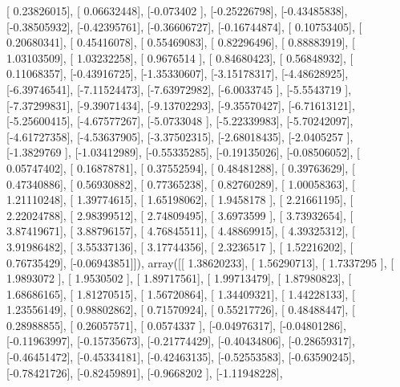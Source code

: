 \documentclass{article}
\begin{document}
       [ 0.23826015],
       [ 0.06632448],
       [-0.073402  ],
       [-0.25226798],
       [-0.43485838],
       [-0.38505932],
       [-0.42395761],
       [-0.36606727],
       [-0.16744874],
       [ 0.10753405],
       [ 0.20680341],
       [ 0.45416078],
       [ 0.55469083],
       [ 0.82296496],
       [ 0.88883919],
       [ 1.03103509],
       [ 1.03232258],
       [ 0.9676514 ],
       [ 0.84680423],
       [ 0.56848932],
       [ 0.11068357],
       [-0.43916725],
       [-1.35330607],
       [-3.15178317],
       [-4.48628925],
       [-6.39746541],
       [-7.11524473],
       [-7.63972982],
       [-6.0033745 ],
       [-5.5543719 ],
       [-7.37299831],
       [-9.39071434],
       [-9.13702293],
       [-9.35570427],
       [-6.71613121],
       [-5.25600415],
       [-4.67577267],
       [-5.0733048 ],
       [-5.22339983],
       [-5.70242097],
       [-4.61727358],
       [-4.53637905],
       [-3.37502315],
       [-2.68018435],
       [-2.0405257 ],
       [-1.3829769 ],
       [-1.03412989],
       [-0.55335285],
       [-0.19135026],
       [-0.08506052],
       [ 0.05747402],
       [ 0.16878781],
       [ 0.37552594],
       [ 0.48481288],
       [ 0.39763629],
       [ 0.47340886],
       [ 0.56930882],
       [ 0.77365238],
       [ 0.82760289],
       [ 1.00058363],
       [ 1.21110248],
       [ 1.39774615],
       [ 1.65198062],
       [ 1.9458178 ],
       [ 2.21661195],
       [ 2.22024788],
       [ 2.98399512],
       [ 2.74809495],
       [ 3.6973599 ],
       [ 3.73932654],
       [ 3.87419671],
       [ 3.88796157],
       [ 4.76845511],
       [ 4.48869915],
       [ 4.39325312],
       [ 3.91986482],
       [ 3.55337136],
       [ 3.17744356],
       [ 2.3236517 ],
       [ 1.52216202],
       [ 0.76735429],
       [-0.06943851]]), array([[ 1.38620233],
       [ 1.56290713],
       [ 1.7337295 ],
       [ 1.9893072 ],
       [ 1.9530502 ],
       [ 1.89717561],
       [ 1.99713479],
       [ 1.87980823],
       [ 1.68686165],
       [ 1.81270515],
       [ 1.56720864],
       [ 1.34409321],
       [ 1.44228133],
       [ 1.23556149],
       [ 0.98802862],
       [ 0.71570924],
       [ 0.55217726],
       [ 0.48488447],
       [ 0.28988855],
       [ 0.26057571],
       [ 0.0574337 ],
       [-0.04976317],
       [-0.04801286],
       [-0.11963997],
       [-0.15735673],
       [-0.21774429],
       [-0.40434806],
       [-0.28659317],
       [-0.46451472],
       [-0.45334181],
       [-0.42463135],
       [-0.52553583],
       [-0.63590245],
       [-0.78421726],
       [-0.82459891],
       [-0.9668202 ],
       [-1.11948228],
\end{document}
